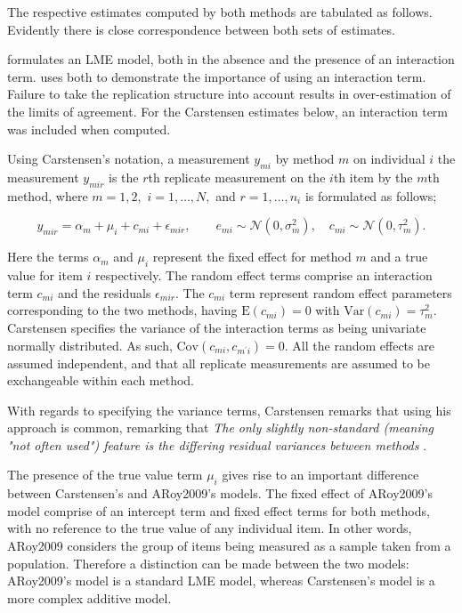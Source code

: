 \documentclass[12pt, a4paper]{report}
\theoremstyle{plain}
\theoremstyle{definition}
\theoremstyle{remark}
\begin{document}
	
	
	
	
	
	
	The respective estimates computed by both methods are tabulated as follows. Evidently there is close correspondence between both sets of estimates.
	
	\citet{BXC2008} formulates an LME model, both in the absence and the presence of an interaction term.\citet{BXC2008} uses both to demonstrate the importance of using an interaction term. Failure to take the replication structure into
	account results in over-estimation of the limits of agreement. 
	For the Carstensen estimates below, an interaction term was included when computed.
	
	
	
	
	Using Carstensen's notation, a measurement $y_{mi}$ by method $m$ on individual $i$ the measurement $y_{mir} $ is the $r$th replicate measurement on the $i$th item by the $m$th method, where $m=1,2,$ $i=1,\ldots,N,$ and $r = 1,\ldots,n_i$ is formulated as follows;
	
	\begin{equation}
	y_{mir}  = \alpha_{m} + \mu_{i} + c_{mi} + \epsilon_{mir}, \qquad  e_{mi}
	\sim \mathcal{N}(0,\sigma^{2}_{m}), \quad c_{mi} \sim \mathcal{N}(0,\tau^{2}_{m}).
	\end{equation}
	
	Here the terms $\alpha_{m}$ and $\mu_{i}$ represent the fixed effect for method $m$ and a true value for item $i$ respectively. The random effect terms comprise an interaction term $c_{mi}$ and the residuals $\epsilon_{mir}$.
	The $c_{mi}$ term represent random effect parameters corresponding to the two methods, having $\mathrm{E}(c_{mi})=0$ with $\mathrm{Var}(c_{mi})=\tau^2_m$. Carstensen specifies the variance of the interaction terms as being univariate normally distributed. As such, $\mathrm{Cov}(c_{mi}, c_{m^\prime i})= 0.$ All the random effects are assumed independent, and that all replicate measurements are assumed to be exchangeable within each method.
	
	With regards to specifying the variance terms, Carstensen remarks that using his approach is common, remarking that \emph{
		The only slightly non-standard (meaning "not often used") feature is the differing residual variances between methods }\citep{BXC2010}.
	
	
	
	The presence of the true value term $\mu_i$ gives rise to an important difference between Carstensen's and ARoy2009's models. The fixed effect of ARoy2009's model comprise of an intercept term and fixed effect terms for both methods, with no reference to the true value of any individual item. In other words, ARoy2009 considers the group of items being measured as a sample taken from a population. Therefore a distinction can be made between the two models: ARoy2009's model is a standard LME model, whereas Carstensen's model is a more complex additive model.
	
\end{document}
